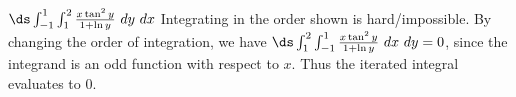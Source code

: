 {$\ds \int_{-1}^{1}\int_1^{2} \frac{x\tan^2y}{1+\ln y}\ dy\ dx$
}
{Integrating in the order shown is hard/impossible. By changing the order of integration, we have $\ds \int_{1}^{2}\int_{-1}^{1} \frac{x\tan^2y}{1+\ln y}\ dx\ dy = 0$, since the integrand is an odd function with respect to $x$. Thus the iterated integral evaluates to 0.
}